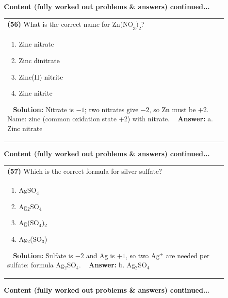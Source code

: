 \documentclass{article}
\begin{document}
\newpage
\noindent
{\large\textbf{Content (fully worked out problems & answers) continued...}}\\[0.2em]
\begin{tabular}{|p{0.9\linewidth}|}
\hline
\vspace{0.2cm}
\textbf{(56)} What is the correct name for $\text{Zn(NO}_3)_2$? \\
\begin{minipage}[t]{0.85\linewidth}
\begin{enumerate}[label=\alph*.]
\item Zinc nitrate \
\item Zinc dinitrate \
\item Zinc(II) nitrite \
\item Zinc nitrite
\end{enumerate}
\end{minipage}\
\hline
\vspace{0.2cm}
\textbf{Solution:} Nitrate is $-1$; two nitrates give $-2$, so Zn must be $+2$. Name: zinc (common oxidation state +2) with nitrate. \
\hline
\vspace{0.2cm}
\textbf{Answer:} a. Zinc nitrate \
\hline
\end{tabular}
\newpage
\noindent
{\large\textbf{Content (fully worked out problems & answers) continued...}}\\[0.2em]
\begin{tabular}{|p{0.9\linewidth}|}
\hline
\vspace{0.2cm}
\textbf{(57)} Which is the correct formula for silver sulfate? \\
\begin{minipage}[t]{0.85\linewidth}
\begin{enumerate}[label=\alph*.]
\item AgSO$_4$ \
\item Ag$_2$SO$_4$ \
\item Ag(SO$_4$)$_2$ \
\item Ag$_2$(SO$_3$)
\end{enumerate}
\end{minipage}\
\hline
\vspace{0.2cm}
\textbf{Solution:} Sulfate is $-2$ and Ag is $+1$, so two Ag$^+$ are needed per sulfate: formula Ag$_2$SO$_4$. \
\hline
\vspace{0.2cm}
\textbf{Answer:} b. Ag$_2$SO$_4$ \
\hline
\end{tabular}
\newpage
\noindent
{\large\textbf{Content (fully worked out problems & answers) continued...}}\\[0.2em]
\end{document}

